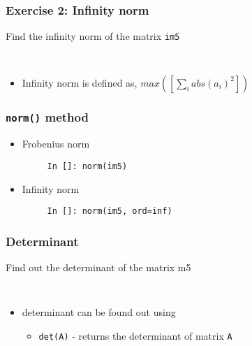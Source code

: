 \documentclass[presentation]{beamer}
\begin{document}
\begin{frame}[fragile]
\frametitle{Exercise 2: Infinity norm}
\label{sec-9}

  Find the infinity norm of the matrix \texttt{im5}
\begin{verbatim}
   
\end{verbatim}

\begin{itemize}
\item Infinity norm is defined as,
       $max([\sum_{i} abs(a_{i})^2])$
\end{itemize}
\end{frame}
\begin{frame}[fragile]
\frametitle{\texttt{norm()} method}
\label{sec-10}

\begin{itemize}
\item Frobenius norm
\begin{verbatim}
     In []: norm(im5)
\end{verbatim}

\item Infinity norm
\begin{verbatim}
     In []: norm(im5, ord=inf)
\end{verbatim}

\end{itemize}
\end{frame}
\begin{frame}[fragile]
\frametitle{Determinant}
\label{sec-11}

  Find out the determinant of the matrix m5
\begin{verbatim}
   
\end{verbatim}

\begin{itemize}
\item determinant can be found out using

\begin{itemize}
\item \texttt{det(A)} - returns the determinant of matrix \texttt{A}
\end{itemize}

\end{itemize}
\end{frame}
\end{document}
